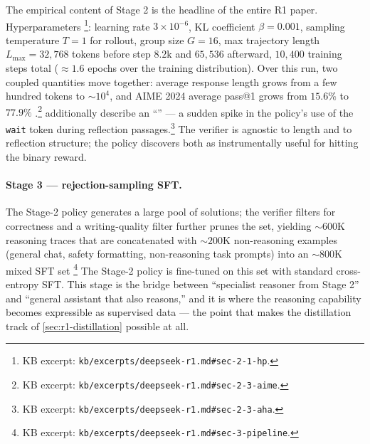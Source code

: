 The empirical content of Stage 2 is the headline of the entire R1
paper. Hyperparameters \citep[\S
2.1]{deepseek-r1}\footnote{KB excerpt:
\nolinkurl{kb/excerpts/deepseek-r1.md#sec-2-1-hp}.}: learning rate
$3\!\times\!10^{-6}$, KL coefficient $\beta = 0.001$, sampling
temperature $T = 1$ for rollout, group size $G = 16$, max trajectory
length $L_\text{max} = 32{,}768$ tokens before step $8.2\text{k}$ and
$65{,}536$ afterward, $10{,}400$ training steps total ($\approx 1.6$
epochs over the training distribution). Over this run, two coupled
quantities move together: average response length grows from a few
hundred tokens to $\sim\!10^4$, and AIME 2024 average pass@1 grows
from $15.6\%$ to $77.9\%$ \citep[\S
2.3]{deepseek-r1}.\footnote{KB excerpt:
\nolinkurl{kb/excerpts/deepseek-r1.md#sec-2-3-aime}.} \citet[\S
2.3]{deepseek-r1} additionally describe an
``'' --- a sudden spike in the policy's use of the
\texttt{wait} token during reflection passages.\footnote{KB excerpt:
\nolinkurl{kb/excerpts/deepseek-r1.md#sec-2-3-aha}.} The verifier is
agnostic to length and to reflection structure; the policy discovers
both as instrumentally useful for hitting the binary reward.

\paragraph{Stage 3 --- rejection-sampling SFT.} The Stage-2 
policy generates a large pool of solutions; the verifier filters for
correctness and a writing-quality filter further prunes the set,
yielding $\sim\!600$K reasoning traces that are concatenated with
$\sim\!200$K non-reasoning examples (general chat, safety formatting,
non-reasoning task prompts) into an $\sim\!800$K mixed
SFT set \citep[\S 3]{deepseek-r1}\footnote{KB excerpt:
\nolinkurl{kb/excerpts/deepseek-r1.md#sec-3-pipeline}.} The Stage-2
policy is fine-tuned on this set with standard cross-entropy SFT.
This stage is the bridge between ``specialist reasoner from Stage 2''
and ``general assistant that also reasons,'' and it is where the
reasoning capability becomes expressible as supervised data --- the
point that makes the distillation track of \cref{sec:r1-distillation}
possible at all.

